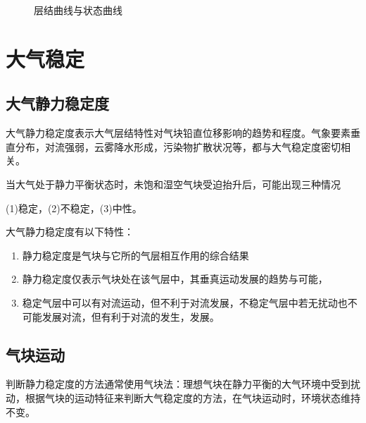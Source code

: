 \documentclass[UTF8,a4paper,11pt,oneside]{ctexbook}
\begin{document}
\begin{figure}[htbp]
    \begin{minipage}{0.7\linewidth}
        \centering
        \caption{层结曲线与状态曲线}
    \end{minipage}
\end{figure}

\chapter{大气稳定}

\section{大气静力稳定度}

大气静力稳定度表示大气层结特性对气块铅直位移影响的趋势和程度。气象要素垂直分布，对流强弱，云雾降水形成，污染物扩散状况等，都与大气稳定度密切相关。

当大气处于静力平衡状态时，未饱和湿空气块受迫抬升后，可能出现三种情况

(1)稳定，(2)不稳定，(3)中性。

大气静力稳定度有以下特性：
\begin{enumerate}
    \item 静力稳定度是气块与它所的气层相互作用的综合结果
    \item 静力稳定度仅表示气块处在该气层中，其垂真运动发展的趋势与可能，
    \item 稳定气层中可以有对流运动，但不利于对流发展，不稳定气层中若无扰动也不可能发展对流，但有利于对流的发生，发展。
\end{enumerate}

\section{气块运动}

判断静力稳定度的方法通常使用气块法：理想气块在静力平衡的大气环境中受到扰动，根据气块的运动特征来判断大气稳定度的方法，在气块运动时，环境状态维持不变。
\end{document}
